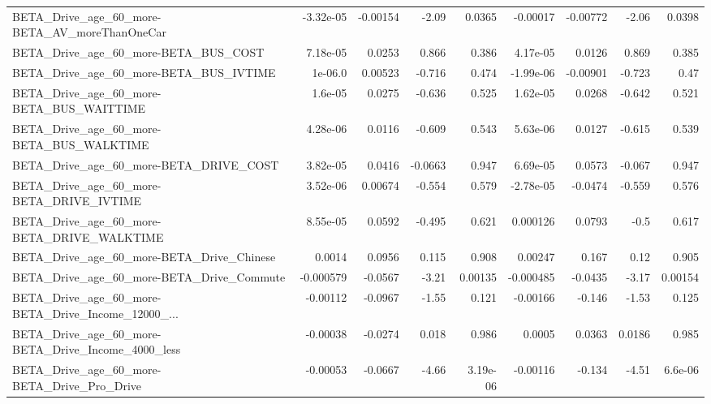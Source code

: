 \begin{tabular}{lrrrrrrrr}
BETA\_Drive\_age\_60\_more-BETA\_AV\_moreThanOneCar      &   -3.32e-05 &     -0.00154 &     -2.09 &   0.0365 &   -0.00017 &    -0.00772 &        -2.06 &        0.0398 \\
BETA\_Drive\_age\_60\_more-BETA\_BUS\_COST               &    7.18e-05 &       0.0253 &     0.866 &    0.386 &   4.17e-05 &      0.0126 &        0.869 &         0.385 \\
BETA\_Drive\_age\_60\_more-BETA\_BUS\_IVTIME             &     1e-06.0 &      0.00523 &    -0.716 &    0.474 &  -1.99e-06 &    -0.00901 &       -0.723 &          0.47 \\
BETA\_Drive\_age\_60\_more-BETA\_BUS\_WAITTIME           &     1.6e-05 &       0.0275 &    -0.636 &    0.525 &   1.62e-05 &      0.0268 &       -0.642 &         0.521 \\
BETA\_Drive\_age\_60\_more-BETA\_BUS\_WALKTIME           &    4.28e-06 &       0.0116 &    -0.609 &    0.543 &   5.63e-06 &      0.0127 &       -0.615 &         0.539 \\
BETA\_Drive\_age\_60\_more-BETA\_DRIVE\_COST             &    3.82e-05 &       0.0416 &   -0.0663 &    0.947 &   6.69e-05 &      0.0573 &       -0.067 &         0.947 \\
BETA\_Drive\_age\_60\_more-BETA\_DRIVE\_IVTIME           &    3.52e-06 &      0.00674 &    -0.554 &    0.579 &  -2.78e-05 &     -0.0474 &       -0.559 &         0.576 \\
BETA\_Drive\_age\_60\_more-BETA\_DRIVE\_WALKTIME         &    8.55e-05 &       0.0592 &    -0.495 &    0.621 &   0.000126 &      0.0793 &         -0.5 &         0.617 \\
BETA\_Drive\_age\_60\_more-BETA\_Drive\_Chinese          &      0.0014 &       0.0956 &     0.115 &    0.908 &    0.00247 &       0.167 &         0.12 &         0.905 \\
BETA\_Drive\_age\_60\_more-BETA\_Drive\_Commute          &   -0.000579 &      -0.0567 &     -3.21 &  0.00135 &  -0.000485 &     -0.0435 &        -3.17 &       0.00154 \\
BETA\_Drive\_age\_60\_more-BETA\_Drive\_Income\_12000\_... &    -0.00112 &      -0.0967 &     -1.55 &    0.121 &   -0.00166 &      -0.146 &        -1.53 &         0.125 \\
BETA\_Drive\_age\_60\_more-BETA\_Drive\_Income\_4000\_less &    -0.00038 &      -0.0274 &     0.018 &    0.986 &     0.0005 &      0.0363 &       0.0186 &         0.985 \\
BETA\_Drive\_age\_60\_more-BETA\_Drive\_Pro\_Drive        &    -0.00053 &      -0.0667 &     -4.66 & 3.19e-06 &   -0.00116 &      -0.134 &        -4.51 &       6.6e-06 \\

\end{tabular}
